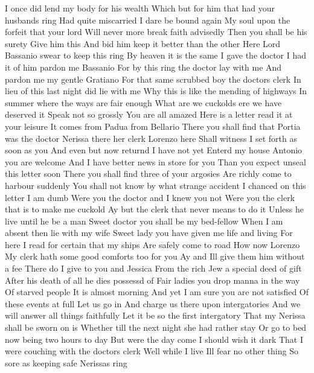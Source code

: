 I once did lend my body for his wealth 
Which but for him that had your husbands ring 
Had quite miscarried I dare be bound again 
My soul upon the forfeit that your lord 
Will never more break faith advisedly 
Then you shall be his surety Give him this 
And bid him keep it better than the other 
Here Lord Bassanio swear to keep this ring 
By heaven it is the same I gave the doctor 
I had it of him pardon me Bassanio 
For by this ring the doctor lay with me 
And pardon me my gentle Gratiano 
For that same scrubbed boy the doctors clerk 
In lieu of this last night did lie with me 
Why this is like the mending of highways 
In summer where the ways are fair enough 
What are we cuckolds ere we have deserved it 
Speak not so grossly You are all amazed 
Here is a letter read it at your leisure 
It comes from Padua from Bellario 
There you shall find that Portia was the doctor 
Nerissa there her clerk Lorenzo here 
Shall witness I set forth as soon as you 
And even but now returnd I have not yet 
Enterd my house Antonio you are welcome 
And I have better news in store for you 
Than you expect unseal this letter soon 
There you shall find three of your argosies 
Are richly come to harbour suddenly 
You shall not know by what strange accident 
I chanced on this letter 
I am dumb 
Were you the doctor and I knew you not 
Were you the clerk that is to make me cuckold 
Ay but the clerk that never means to do it 
Unless he live until he be a man 
Sweet doctor you shall be my bed-fellow 
When I am absent then lie with my wife 
Sweet lady you have given me life and living 
For here I read for certain that my ships 
Are safely come to road 
How now Lorenzo 
My clerk hath some good comforts too for you 
Ay and Ill give them him without a fee 
There do I give to you and Jessica 
From the rich Jew a special deed of gift 
After his death of all he dies possessd of 
Fair ladies you drop manna in the way 
Of starved people 
It is almost morning 
And yet I am sure you are not satisfied 
Of these events at full Let us go in 
And charge us there upon intergatories 
And we will answer all things faithfully 
Let it be so the first intergatory 
That my Nerissa shall be sworn on is 
Whether till the next night she had rather stay 
Or go to bed now being two hours to day 
But were the day come I should wish it dark 
That I were couching with the doctors clerk 
Well while I live Ill fear no other thing 
So sore as keeping safe Nerissas ring 
